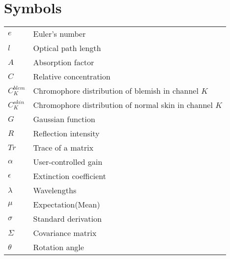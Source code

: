 \chapter*{\centering Symbols}
\begin{spacing}{1.5}
\setlength{\parskip}{0.3in}

\begin{table}[ht]
\centering
\begin{tabular}{ll}
\textbf{$e$} & Euler's number\\
\textbf{$l$} & Optical path length\\
\textbf{$A$} & Absorption factor\\
\textbf{$C$} & Relative concentration\\
\textbf{$C_K^{blem}$} & Chromophore distribution of blemish in channel $K$\\
\textbf{$C_K^{skin}$} & Chromophore distribution of normal skin in channel $K$\\
\textbf{$G$} & Gaussian function\\
\textbf{$R$} & Reflection intensity\\
\textbf{$Tr$} & Trace of a matrix\\
\textbf{$\alpha$} & User-controlled gain\\
\textbf{$\epsilon$} & Extinction coefficient\\
\textbf{$\lambda$} & Wavelengths\\
\textbf{$\mu$} & Expectation(Mean)\\
\textbf{$\sigma$} & Standard derivation\\
\textbf{$\Sigma$} & Covariance matrix\\
\textbf{$\theta$} & Rotation angle\\
\end{tabular}%
\end{table}

\end{spacing}
\newpage
